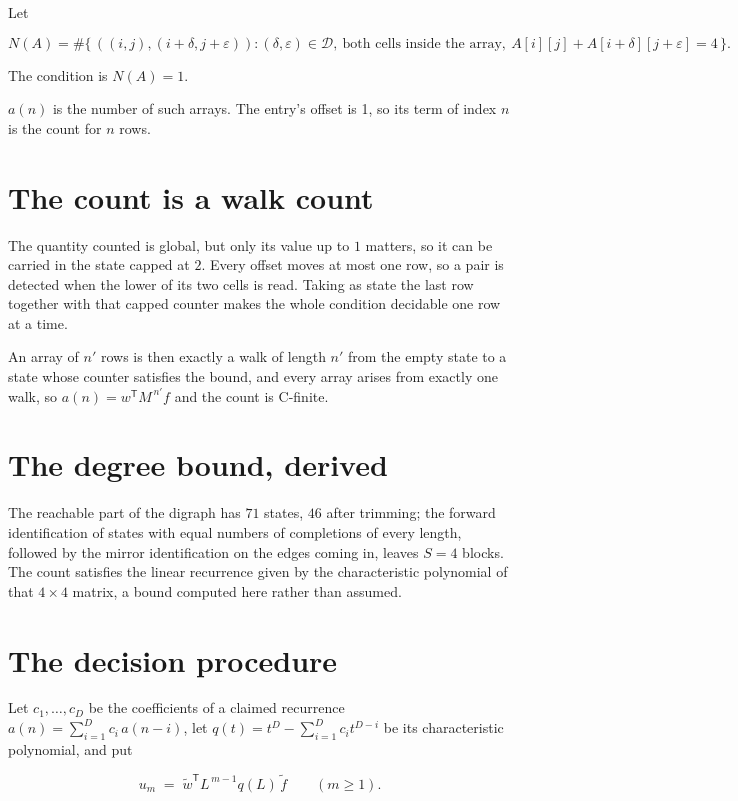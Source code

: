 \documentclass[11pt]{article}
\theoremstyle{definition}
\begin{document}
Let

\[N(A) = \#\bigl\{\,((i,j),(i{+}\delta,j{+}\varepsilon)) : (\delta,\varepsilon) \in \mathcal{D},\ \text{both cells inside the array},\ A[i][j] + A[i{+}\delta][j{+}\varepsilon] = 4\,\bigr\}.\]

The condition is $N(A) = 1$.

$a(n)$ is the number of such arrays. The entry's offset is 1, so its term of index $n$ is the count for $n$ rows.

\section{The count is a walk count}

The quantity counted is global, but only its value up to $1$ matters, so it can be carried in the state capped at $2$. Every offset moves at most one row, so a pair is detected when the lower of its two cells is read. Taking as state the last row together with that capped counter makes the whole condition decidable one row at a time.

An array of $n'$ rows is then exactly a walk of length $n'$ from the empty state to a state whose counter satisfies the bound, and every array arises from exactly one walk, so $a(n) = w^{\mathsf T}M^{\,n'}f$ and the count is C-finite.

\section{The degree bound, derived}

The reachable part of the digraph has $71$ states, $46$ after trimming; the forward identification of states with equal numbers of completions of every length, followed by the mirror identification on the edges coming in, leaves $S = 4$ blocks. The count satisfies the linear recurrence given by the characteristic polynomial of that $4\times4$ matrix, a bound computed here rather than assumed.

\section{The decision procedure}

Let $c_1,\dots,c_D$ be the coefficients of a claimed recurrence $a(n) = \sum_{i=1}^{D} c_i\,a(n-i)$, let $q(t) = t^{D} - \sum_{i=1}^{D} c_i t^{D-i}$ be its characteristic polynomial, and put

\[u_m \;=\; \tilde w^{\mathsf T} L^{\,m-1} q(L)\,\tilde f \qquad (m \ge 1).\]
\end{document}
